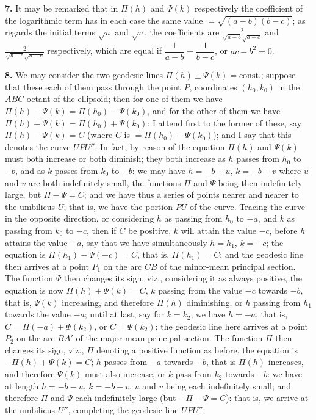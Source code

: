\documentclass[11pt,a4paper]{article}
\begin{document}
\noindent\textbf{7.} It may be remarked that in $\Pi(h)$ and $\Psi(k)$ respectively the coefficient of the logarithmic term has in each case the same value $= \sqrt{(a-b)(b-c)}$; as regards the initial terms $\sqrt{u}$ and $\sqrt{v}$, the coefficients are $\tfrac{2}{\sqrt{a-b}\sqrt{a-c}}$ and $\tfrac{2}{\sqrt{b-c}\sqrt{a-c}}$ respectively, which are equal if $\dfrac{1}{a-b} = \dfrac{1}{b-c}$, or $ac - b^{2} = 0$.

\noindent\textbf{8.} We may consider the two geodesic lines $\Pi(h) \pm \Psi(k) = \text{const.}$; suppose that these each of them pass through the point $P$, coordinates $(h_{0}, k_{0})$ in the $ABC$ octant of the ellipsoid; then for one of them we have $\Pi(h) - \Psi(k) = \Pi(h_{0}) - \Psi(k_{0})$, and for the other of them we have $\Pi(h) + \Psi(k) = \Pi(h_{0}) + \Psi(k_{0})$: I attend first to the former of these, say $\Pi(h) - \Psi(k) = C$ (where $C$ is $= \Pi(h_{0}) - \Psi(k_{0})$); and I say that this denotes the curve $UPU''$. In fact, by reason of the equation $\Pi(h)$ and $\Psi(k)$ must both increase or both diminish; they both increase as $h$ passes from $h_{0}$ to $-b$, and as $k$ passes from $k_{0}$ to $-b$: we may have $h = -b + u$, $k = -b + v$ where $u$ and $v$ are both indefinitely small, the functions $\Pi$ and $\Psi$ being then indefinitely large, but $\Pi - \Psi = C$; and we have thus a series of points nearer and nearer to the umbilicus $U$; that is, we have the portion $PU$ of the curve. Tracing the curve in the opposite direction, or considering $h$ as passing from $h_{0}$ to $-a$, and $k$ as passing from $k_{0}$ to $-c$, then if $C$ be positive, $k$ will attain the value $-c$, before $h$ attains the value $-a$, say that we have simultaneously $h = h_{1}$, $k = -c$; the equation is $\Pi(h_{1}) - \Psi(-c) = C$, that is, $\Pi(h_{1}) = C$; and the geodesic line then arrives at a point $P_{1}$ on the arc $CB$ of the minor-mean principal section. The function $\Psi$ then changes its sign, viz., considering it as always positive, the equation is now $\Pi(h) + \Psi(k) = C$, $k$ passing from the value $-c$ towards $-b$, that is, $\Psi(k)$ increasing, and therefore $\Pi(h)$ diminishing, or $h$ passing from $h_{1}$ towards the value $-a$; until at last, say for $k = k_{2}$, we have $h = -a$, that is, $C = \Pi(-a) + \Psi(k_{2})$, or $C = \Psi(k_{2})$; the geodesic line here arrives at a point $P_{2}$ on the arc $BA'$ of the major-mean principal section. The function $\Pi$ then changes its sign, viz., $\Pi$ denoting a positive function as before, the equation is $-\Pi(h) + \Psi(k) = C$; $h$ passes from $-a$ towards $-b$, that is $\Pi(h)$ increases, and therefore $\Psi(k)$ must also increase, or $k$ pass from $k_{2}$ towards $-b$: we have at length $h = -b - u$, $k = -b + v$, $u$ and $v$ being each indefinitely small; and therefore $\Pi$ and $\Psi$ each indefinitely large (but $-\Pi + \Psi = C$): that is, we arrive at the umbilicus $U''$, completing the geodesic line $UPU''$.
\end{document}
